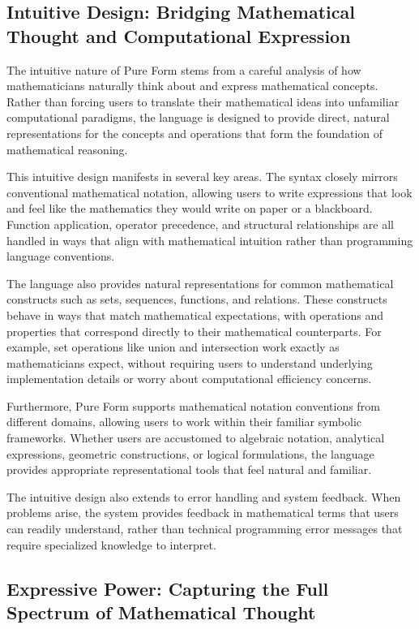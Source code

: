 \subsection{Intuitive Design: Bridging Mathematical Thought and Computational Expression}

The intuitive nature of Pure Form stems from a careful analysis of how mathematicians naturally think about and express mathematical concepts.
Rather than forcing users to translate their mathematical ideas into unfamiliar computational paradigms, the language is designed to provide direct, natural representations for the concepts and operations that form the foundation of mathematical reasoning.

This intuitive design manifests in several key areas.
The syntax closely mirrors conventional mathematical notation, allowing users to write expressions that look and feel like the mathematics they would write on paper or a blackboard.
Function application, operator precedence, and structural relationships are all handled in ways that align with mathematical intuition rather than programming language conventions.

The language also provides natural representations for common mathematical constructs such as sets, sequences, functions, and relations.
These constructs behave in ways that match mathematical expectations, with operations and properties that correspond directly to their mathematical counterparts.
For example, set operations like union and intersection work exactly as mathematicians expect, without requiring users to understand underlying implementation details or worry about computational efficiency concerns.

Furthermore, Pure Form supports mathematical notation conventions from different domains, allowing users to work within their familiar symbolic frameworks.
Whether users are accustomed to algebraic notation, analytical expressions, geometric constructions, or logical formulations, the language provides appropriate representational tools that feel natural and familiar.

The intuitive design also extends to error handling and system feedback.
When problems arise, the system provides feedback in mathematical terms that users can readily understand, rather than technical programming error messages that require specialized knowledge to interpret.

\subsection{Expressive Power: Capturing the Full Spectrum of Mathematical Thought}

